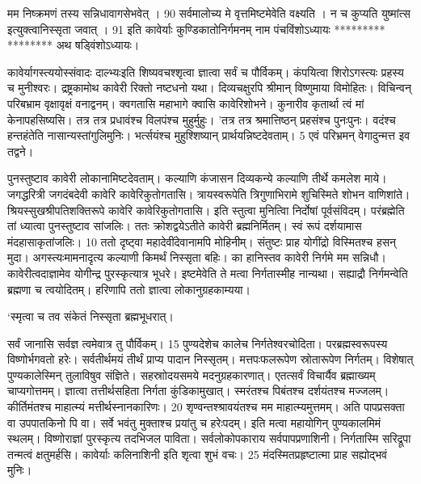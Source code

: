 मम निष्क्रमणं तस्य सन्निधावागसेभवेत् ।
90 सर्वमालोच्य मे वृत्तमिष्टमेवेति वक्ष्यति ।
 न च कुप्यति युष्मांत्स
इत्युक्त्वानिस्सृता जवात् ।
91 इति कावेर्याः कुण्डिकातोनिर्गमनम् नाम
पंचविंशोऽध्यायः
*********
********
अथ षड्विंशोऽध्यायः।

कावेर्यागस्त्ययोस्संवादः दाल्भ्यःइति शिष्यवचश्शृत्वा ज्ञात्वा सर्वं च पौर्विकम्।
 कंपयित्वा शिरोऽगस्त्यः प्रहस्य च मुनीश्वरः।
 द्रष्ट्रकामोथ कावेरी रिक्तो नष्टधनो यथा।
 दिव्यचक्षुरपि श्रीमान् विष्णुमाया विमोहितः।
 विचिन्वन् परिबभ्राम वृक्षावृक्षं वनाद्वनम्।
 क्वगतासि महाभागे क्वासि कावेरिशोभने।
 कुनारीव कृतार्था त्वं मां केनापहसिष्यसि।
 तत्र तत्र प्रधावंश्च विलपंश्च मुहुर्मुहुः।
 'तत्र तत्र श्रमात्तिष्ठन् प्रहसंश्च पुनःपुनः।
 वदंश्च हन्तहंतेति नासान्यस्तांगुलिमुनिः।
 भर्त्सयंश्च मुहुश्शिष्यान् प्रार्थयन्निष्टदेवताम्।
 5 एवं परिभ्रमन् वेगादुन्मत्त इव तद्वने।

पुनस्तुष्टाव कावेरी लोकानामिष्टदेवताम्।
 कल्याणि कंजासन दिव्यकन्ये
कल्याणि तीर्थे कमलेश माये।
 जगद्धरित्री जगदंबदेवी कावेरि कावेरिकुतोगतासि।
 त्रायस्वरूपेति त्रिगुणाभिरामे
शुचिस्मिते शोभन वाणिशांते।
 श्रियस्सुखश्रीपतिशक्तिरूपे
कावेरि कावेरिकुतोगतासि।
 इति स्तुत्वा मुनित्विा निर्दोषां पूर्वसंविदम्।
 परंब्रह्मेति तां ध्यात्वा पुनस्तुष्टाव सांजलिः।
 ततः क्रोशद्वयेऽतीते कावेरी ब्रह्मनिर्मितम्।
 स्वं रूपं दर्शयामास मंदहासाकृतांजलिः।
 10 ततो दृष्ट्वा महादेवींदेवानामपि मोहिनीम्।
 संतुष्टः प्राह योगींद्रो विस्मितश्च हसन् मुदा।
 अगस्त्यःमामनादृत्य कल्याणी किमर्थं निस्सृता बहिः।
 का हानिस्तव कावेरी निर्गमे मम सन्निधौ।
 कावेरीत्वदाज्ञामेव योगीन्द्र पुरस्कृत्यात्र भूधरे।
 इष्टमेवेति ते मत्वा निर्गतास्मीह नान्यथा।
 सह्याद्रौ निर्गमन्वेति ब्रह्मणा च त्वयोदितम्।
 हरिणापि ततो ज्ञात्वा लोकानुग्रहकाम्यया।
 
‘स्मृत्वा च तव संकेतं निस्सृता ब्रह्मभूधरात्।

सर्वं जानासि सर्वज्ञ त्वमेवात्र तु पौर्विकम्।
15 पुण्यदेशेच कालेच निर्गतेश्वरचोदिता।
 परब्रह्मस्वरूपस्य विष्णोर्भगवतो हरेः।
 सर्वतीर्थमयं तीर्थं प्राप्य पादान निस्सृतम्।
 मत्तपःफलरूपेण स्रोतारूपेण निर्गतम्।
 विशेषात् पुण्यकालेस्मिन् तुलाविषुव संज्ञिते।
 सहस्राोदयसमये मदनुग्रहकारणात्।
 एतत्सर्वं विचार्यैव ब्रह्माख्यम् चाप्यगोत्तमम्।
 ज्ञात्वा तत्तीर्थसहिता निर्गता कुंडिकामुखात्।
 स्मरंतश्च पिबंतश्च दर्शयंतश्च मज्जलम्।
 कीर्तिमंतश्च माहात्म्यं मत्तीर्थस्नानकारिणः।
 20 शृण्वन्तश्श्रावयंतश्च मम माहात्म्यमुत्तमम्।
 अति पापप्रसक्ता वा उपपातकिनो पि वा।
 सर्वे भवंतु मुक्ताश्च प्रयांतु च हरेःपदम्।
 इति मत्वा महायोगिन् पुण्यकालमिमं स्थलम्।
 विष्णोराज्ञां पुरस्कृत्य तदभिजल पाविता।
 सर्वलोकोपकाराय सर्वपापप्रणाशिनी।
 निर्गतास्मि सरिद्रूपा तन्मत्वं क्षतुमर्हसि।
 कावेर्याः कलिनाशिनी इति शृत्वा शुभं वचः।
 25 मंदस्मितप्रहृष्टात्मा प्राह सह्योद्भवं मुनिः।
 
